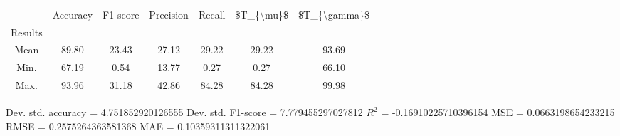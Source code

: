 \begin{tabular}{|c|c|c|c|c|c|c|}
\toprule
{} &  Accuracy &  F1 score &  Precision &  Recall &  \$T\_\{\textbackslash mu\}\$ &  \$T\_\{\textbackslash gamma\}\$ \\
Results &           &           &            &         &            &               \\
\hline
Mean    &     89.80 &     23.43 &      27.12 &   29.22 &      29.22 &         93.69 \\
Min.    &     67.19 &      0.54 &      13.77 &    0.27 &       0.27 &         66.10 \\
Max.    &     93.96 &     31.18 &      42.86 &   84.28 &      84.28 &         99.98 \\
\bottomrule
\end{tabular}

 Dev. std. accuracy = 4.751852920126555
 Dev. std. F1-score = 7.779455297027812
 $R^2$ = -0.16910225710396154
 MSE = 0.0663198654233215
 RMSE = 0.2575264363581368
 MAE = 0.10359311311322061